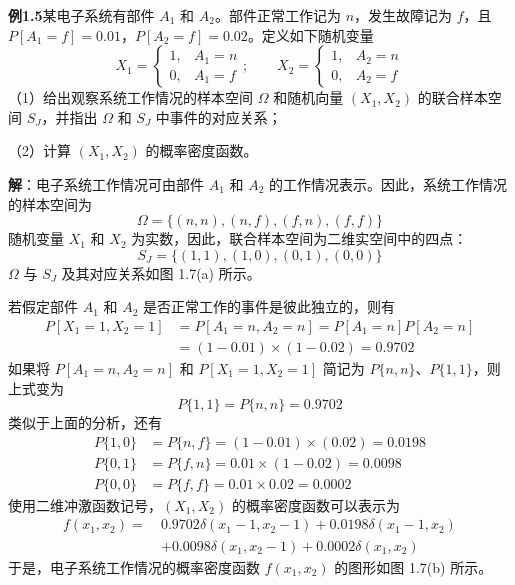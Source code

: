 \documentclass[11pt,openany,UTF8]{ctexbook}
\begin{document}
\begin{examplebox}
\textbf{例1.5}\quad 某电子系统有部件 $A_1$ 和 $A_2$\nobreak。部件正常工作记为 $n$\nobreak，发生故障记为 $f$\nobreak，且 $P[A_1=f]=0.01$\nobreak，$P[A_2=f]=0.02$\nobreak。定义如下随机变量
\[
X_1=\begin{cases}1,&A_1=n\\ 0,&A_1=f\end{cases};\qquad
X_2=\begin{cases}1,&A_2=n\\ 0,&A_2=f\end{cases}
\]
（1\nobreak）给出观察系统工作情况的样本空间 $\Omega$ 和随机向量 $(X_1,X_2)$ 的联合样本空间 $S_J$\nobreak，并指出 $\Omega$ 和 $S_J$ 中事件的对应关系\nobreak；

（2\nobreak）计算 $(X_1,X_2)$ 的概率密度函数\nobreak。

\textbf{解}\nobreak：电子系统工作情况可由部件 $A_1$ 和 $A_2$ 的工作情况表示\nobreak。因此\nobreak，系统工作情况的样本空间为
\[
\Omega=\{(n,n),(n,f),(f,n),(f,f)\}
\]
随机变量 $X_1$ 和 $X_2$ 为实数\nobreak，因此\nobreak，联合样本空间为二维实空间中的四点\nobreak：
\[
S_J=\{(1,1),(1,0),(0,1),(0,0)\}
\]
$\Omega$ 与 $S_J$ 及其对应关系如图 1.7(a) 所示\nobreak。

若假定部件 $A_1$ 和 $A_2$ 是否正常工作的事件是彼此独立的\nobreak，则有
\[
\begin{aligned}
P[X_1=1,X_2=1]&=P[A_1=n,A_2=n]=P[A_1=n]P[A_2=n]\\
&=(1-0.01)\times(1-0.02)=0.9702
\end{aligned}
\]
如果将 $P[A_1=n,A_2=n]$ 和 $P[X_1=1,X_2=1]$ 简记为 $P\{n,n\}$\nobreak、$P\{1,1\}$\nobreak，则上式变为
\[
P\{1,1\}=P\{n,n\}=0.9702
\]
类似于上面的分析\nobreak，还有
\[
\begin{aligned}
P\{1,0\}&=P\{n,f\}=(1-0.01)\times(0.02)=0.0198\\
P\{0,1\}&=P\{f,n\}=0.01\times(1-0.02)=0.0098\\
P\{0,0\}&=P\{f,f\}=0.01\times0.02=0.0002
\end{aligned}
\]
使用二维冲激函数记号\nobreak，$(X_1,X_2)$ 的概率密度函数可以表示为
\[
\begin{aligned}
f(x_1,x_2)=\ &0.9702\delta(x_1-1,x_2-1)+0.0198\delta(x_1-1,x_2)\\
&+0.0098\delta(x_1,x_2-1)+0.0002\delta(x_1,x_2)
\end{aligned}
\]
于是\nobreak，电子系统工作情况的概率密度函数 $f(x_1,x_2)$ 的图形如图 1.7(b) 所示\nobreak。
\end{examplebox}
\end{document}
